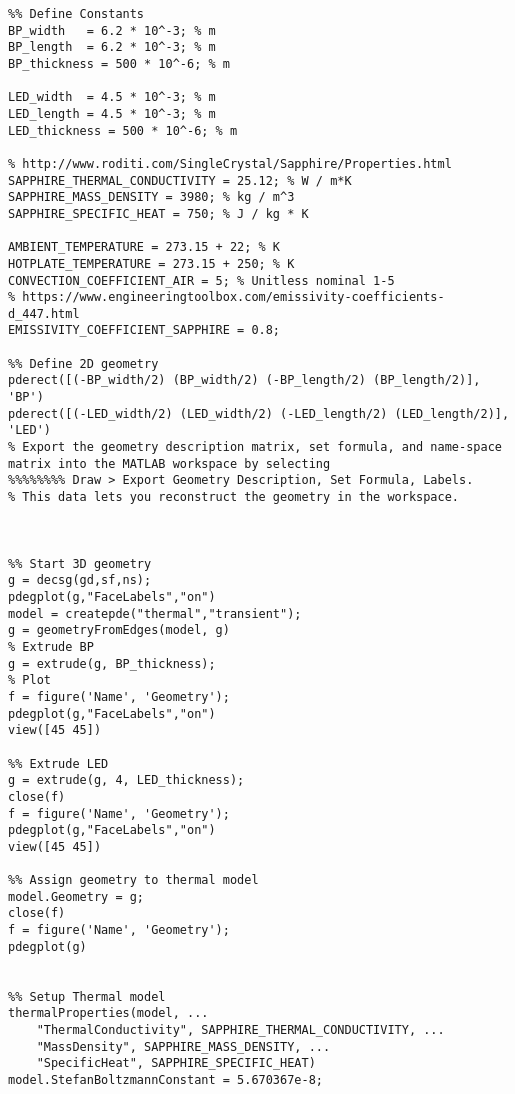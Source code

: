 
\begin{lstlisting}
%% Define Constants
BP_width   = 6.2 * 10^-3; % m
BP_length  = 6.2 * 10^-3; % m
BP_thickness = 500 * 10^-6; % m

LED_width  = 4.5 * 10^-3; % m
LED_length = 4.5 * 10^-3; % m
LED_thickness = 500 * 10^-6; % m

% http://www.roditi.com/SingleCrystal/Sapphire/Properties.html
SAPPHIRE_THERMAL_CONDUCTIVITY = 25.12; % W / m*K
SAPPHIRE_MASS_DENSITY = 3980; % kg / m^3
SAPPHIRE_SPECIFIC_HEAT = 750; % J / kg * K

AMBIENT_TEMPERATURE = 273.15 + 22; % K
HOTPLATE_TEMPERATURE = 273.15 + 250; % K
CONVECTION_COEFFICIENT_AIR = 5; % Unitless nominal 1-5
% https://www.engineeringtoolbox.com/emissivity-coefficients-d_447.html
EMISSIVITY_COEFFICIENT_SAPPHIRE = 0.8;

%% Define 2D geometry
pderect([(-BP_width/2) (BP_width/2) (-BP_length/2) (BP_length/2)], 'BP')
pderect([(-LED_width/2) (LED_width/2) (-LED_length/2) (LED_length/2)], 'LED')
% Export the geometry description matrix, set formula, and name-space matrix into the MATLAB workspace by selecting
%%%%%%%% Draw > Export Geometry Description, Set Formula, Labels.
% This data lets you reconstruct the geometry in the workspace.



%% Start 3D geometry
g = decsg(gd,sf,ns);
pdegplot(g,"FaceLabels","on")
model = createpde("thermal","transient");
g = geometryFromEdges(model, g)
% Extrude BP
g = extrude(g, BP_thickness);
% Plot
f = figure('Name', 'Geometry');
pdegplot(g,"FaceLabels","on")
view([45 45])

%% Extrude LED
g = extrude(g, 4, LED_thickness);
close(f)
f = figure('Name', 'Geometry');
pdegplot(g,"FaceLabels","on")
view([45 45])

%% Assign geometry to thermal model
model.Geometry = g;
close(f)
f = figure('Name', 'Geometry');
pdegplot(g)


%% Setup Thermal model
thermalProperties(model, ...
    "ThermalConductivity", SAPPHIRE_THERMAL_CONDUCTIVITY, ...
    "MassDensity", SAPPHIRE_MASS_DENSITY, ...
    "SpecificHeat", SAPPHIRE_SPECIFIC_HEAT)
model.StefanBoltzmannConstant = 5.670367e-8;


\end{lstlisting}
